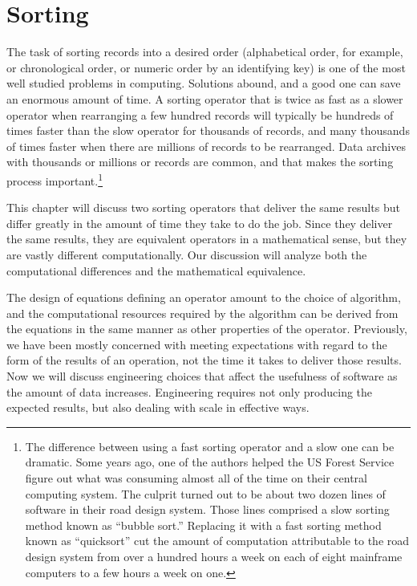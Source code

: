 \chapter{Sorting}
\label{ch:sorting}

The task of sorting records into a desired order
(alphabetical order, for example, or chronological order,
or numeric order by an identifying key)
is one of the most well studied problems in computing.
Solutions abound,
and a good one can save an enormous amount of time.
A sorting operator that is twice as fast
as a slower operator when rearranging a few hundred records
will typically be hundreds of times faster than the slow operator
for thousands of records, and many thousands of times faster
when there are millions of records to be rearranged.
Data archives with thousands or millions or records
are common, and that makes the sorting process important.\footnote{The
difference between using a fast sorting operator and a slow one
can be dramatic.
Some years ago, one of the authors helped the US Forest Service
figure out what was consuming almost all of the time
on their central computing system.
The culprit turned out to be about two dozen lines
of software in their road design system.
Those lines comprised a slow sorting method
known as ``bubble sort.'' Replacing it with a fast sorting
method known as ``quicksort'' cut the amount of computation
attributable to the road design system from over a hundred
hours a week on each of eight mainframe computers to a few hours
a week on one.}

This chapter will discuss two sorting operators that
deliver the same results but differ
greatly in the amount of time they take to do the job.
Since they deliver the same results,
they are equivalent operators in a mathematical sense,
but they are vastly different computationally.
Our discussion will analyze both the computational differences
and the mathematical equivalence.

The design of equations defining an operator
amount to the choice of algorithm, and the computational
resources required by the algorithm can be derived
from the equations in the same manner as other properties
of the operator.
Previously, we have been mostly concerned with meeting
expectations with regard to the form of the results
of an operation, not the time it takes to deliver those results.
Now we will discuss engineering choices that affect the usefulness of
software as the amount of data increases.
Engineering requires not only producing the expected
results, but also dealing with scale in effective ways.

